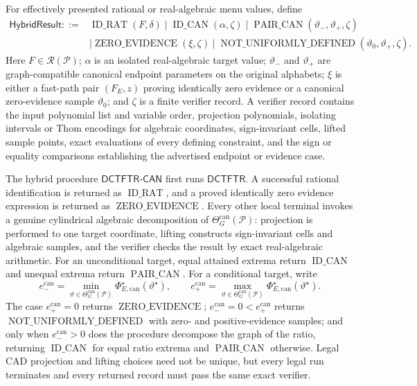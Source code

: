 For effectively presented rational or real-algebraic menu values, define
\[
\begin{split}
\mathsf{HybridResult}::={}&
\operatorname{ID\_RAT}(F,\delta)
\mid\operatorname{ID\_CAN}(\alpha,\zeta)
\mid\operatorname{PAIR\_CAN}(\vartheta_-,\vartheta_+,\zeta)\\
&\mid\operatorname{ZERO\_EVIDENCE}(\xi,\zeta)
\mid\operatorname{NOT\_UNIFORMLY\_DEFINED}(\vartheta_0,\vartheta_+,\zeta).
\end{split}
\]
Here \(F\in\mathscr R(\mathcal P)\); \(\alpha\) is an isolated real-algebraic target value; \(\vartheta_-\) and \(\vartheta_+\) are graph-compatible canonical endpoint parameters on the original alphabets; \(\xi\) is either a fast-path pair \((F_E,z)\) proving identically zero evidence or a canonical zero-evidence sample \(\vartheta_0\); and \(\zeta\) is a finite verifier record.  A verifier record contains the input polynomial list and variable order, projection polynomials, isolating intervals or Thom encodings for algebraic coordinates, sign-invariant cells, lifted sample points, exact evaluations of every defining constraint, and the sign or equality comparisons establishing the advertised endpoint or evidence case.

The hybrid procedure \(\mathsf{DCTFTR\text{-}CAN}\) first runs \(\mathsf{DCTFTR}\).  A successful rational identification is returned as \(\operatorname{ID\_RAT}\), and a proved identically zero evidence expression is returned as \(\operatorname{ZERO\_EVIDENCE}\).  Every other local terminal invokes a genuine cylindrical algebraic decomposition of \(\Theta_G^{\mathrm{can}}(\mathcal P)\): projection is performed to one target coordinate, lifting constructs sign-invariant cells and algebraic samples, and the verifier checks the result by exact real-algebraic arithmetic.  For an unconditional target, equal attained extrema return \(\operatorname{ID\_CAN}\) and unequal extrema return \(\operatorname{PAIR\_CAN}\).  For a conditional target, write
\[
e_-^{\mathrm{can}}=\min_{\vartheta\in\Theta_G^{\mathrm{can}}(\mathcal P)}
\Phi_{E,\mathrm{can}}^\star(\vartheta^\star),
\qquad
e_+^{\mathrm{can}}=\max_{\vartheta\in\Theta_G^{\mathrm{can}}(\mathcal P)}
\Phi_{E,\mathrm{can}}^\star(\vartheta^\star).
\]
The case \(e_+^{\mathrm{can}}=0\) returns \(\operatorname{ZERO\_EVIDENCE}\); \(e_-^{\mathrm{can}}=0<e_+^{\mathrm{can}}\) returns \(\operatorname{NOT\_UNIFORMLY\_DEFINED}\) with zero- and positive-evidence samples; and only when \(e_-^{\mathrm{can}}>0\) does the procedure decompose the graph of the ratio, returning \(\operatorname{ID\_CAN}\) for equal ratio extrema and \(\operatorname{PAIR\_CAN}\) otherwise.  Legal CAD projection and lifting choices need not be unique, but every legal run terminates and every returned record must pass the same exact verifier.